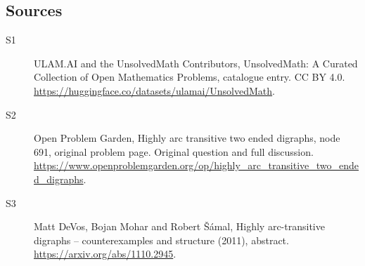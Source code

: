 \documentclass[11pt]{article}
\begin{document}
\subsection{Sources}
\begin{description}
\item[\hypertarget{source:statement:1}{S1}] ULAM.AI and the UnsolvedMath Contributors, UnsolvedMath: A Curated Collection of Open Mathematics Problems, catalogue entry. CC BY 4.0. \url{https://huggingface.co/datasets/ulamai/UnsolvedMath}.
\item[\hypertarget{source:statement:2}{S2}] Open Problem Garden, Highly arc transitive two ended digraphs, node 691, original problem page. Original question and full discussion. \url{https://www.openproblemgarden.org/op/highly_arc_transitive_two_ended_digraphs}.
\item[\hypertarget{source:statement:3}{S3}] Matt DeVos, Bojan Mohar and Robert Šámal, Highly arc-transitive digraphs -- counterexamples and structure (2011), abstract. \url{https://arxiv.org/abs/1110.2945}.
\end{description}
\label{end:statement}
\end{document}
